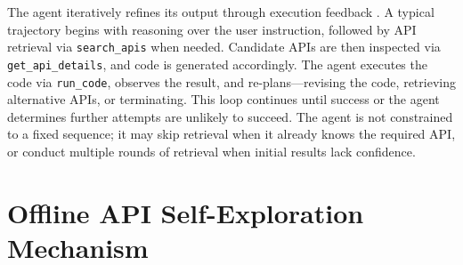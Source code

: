 \documentclass[anonymous, sigconf]{acmart}
\begin{document}
The agent iteratively refines its output through execution feedback \cite{cline2024cline}. A typical trajectory begins with reasoning over the user instruction, followed by API retrieval via \texttt{search\_apis} when needed. Candidate APIs are then inspected via \texttt{get\_api\_details}, and code is generated accordingly. The agent executes the code via \texttt{run\_code}, observes the result, and re-plans—revising the code, retrieving alternative APIs, or terminating. This loop continues until success or the agent determines further attempts are unlikely to succeed. The agent is not constrained to a fixed sequence; it may skip retrieval when it already knows the required API, or conduct multiple rounds of retrieval when initial results lack confidence.

\section{Offline API Self-Exploration Mechanism}
\label{sec:selfdoc}
\end{document}
